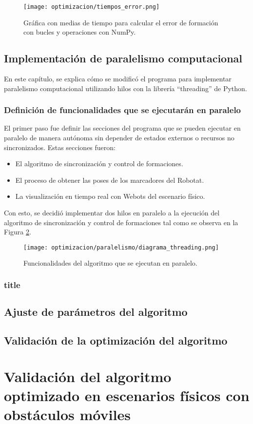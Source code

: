 \begin{figure}[H]
	\centering
	\texttt{[image: optimizacion/tiempos\_error.png]}
	\caption{Gráfica con medias de tiempo para calcular el error de formación con bucles y operaciones con NumPy.}
	\label{fig:grafica_tiempos_error}
\end{figure}

\section{Implementación de paralelismo computacional}
En este capítulo, se explica cómo se modificó el programa para implementar paralelismo computacional utilizando hilos con la librería ``threading'' de Python.

\subsection{Definición de funcionalidades que se ejecutarán en paralelo}
El primer paso fue definir las secciones del programa que se pueden ejecutar en paralelo de manera autónoma sin depender de estados externos o recursos no sincronizados. Estas secciones fueron:
\begin{itemize}
	\item El algoritmo de sincronización y control de formaciones.
	\item El proceso de obtener las poses de los marcadores del Robotat.
	\item La visualización en tiempo real con Webots del escenario físico.
\end{itemize}

Con esto, se decidió implementar dos hilos en paralelo a la ejecución del algoritmo de sincronización y control de formaciones tal como se observa en la Figura \ref{fig:hilos}.

\begin{figure}[H]
	\centering
	\texttt{[image: optimizacion/paralelismo/diagrama\_threading.png]}
	\caption{Funcionalidades del algoritmo que se ejecutan en paralelo.}
	\label{fig:hilos}
\end{figure}

\subsection{title}

\section{Ajuste de parámetros del algoritmo}

\section{Validación de la optimización del algoritmo}

\chapter{Validación del algoritmo optimizado en escenarios físicos con obstáculos móviles}\label{cap:validacion}






